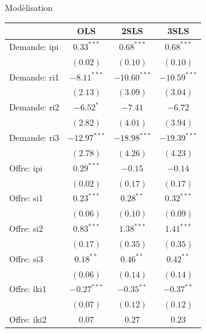 \documentclass[11pt,ignorenonframetext,]{beamer}
\begin{document}
\begin{frame}{Modèlisation}
\protect\hypertarget{modelisation-2}{}

\tiny

\begin{table}[!htbp]
\begin{center}
\begin{tabular}{l c c c }
\hline
 & OLS & 2SLS & 3SLS \\
\hline
Demande: ipi        & $0.33^{***}$   & $0.68^{***}$   & $0.68^{***}$   \\
                    & $(0.02)$       & $(0.10)$       & $(0.10)$       \\
Demande: ri1        & $-8.11^{***}$  & $-10.60^{***}$ & $-10.59^{***}$ \\
                    & $(2.13)$       & $(3.09)$       & $(3.04)$       \\
Demande: ri2        & $-6.52^{*}$    & $-7.41$        & $-6.72$        \\
                    & $(2.82)$       & $(4.01)$       & $(3.94)$       \\
Demande: ri3        & $-12.97^{***}$ & $-18.98^{***}$ & $-19.39^{***}$ \\
                    & $(2.78)$       & $(4.26)$       & $(4.23)$       \\
Offre: ipi          & $0.29^{***}$   & $-0.15$        & $-0.14$        \\
                    & $(0.02)$       & $(0.17)$       & $(0.17)$       \\
Offre: si1          & $0.23^{***}$   & $0.28^{**}$    & $0.32^{***}$   \\
                    & $(0.06)$       & $(0.10)$       & $(0.09)$       \\
Offre: si2          & $0.83^{***}$   & $1.38^{***}$   & $1.41^{***}$   \\
                    & $(0.17)$       & $(0.35)$       & $(0.35)$       \\
Offre: si3          & $0.18^{**}$    & $0.46^{**}$    & $0.42^{**}$    \\
                    & $(0.06)$       & $(0.14)$       & $(0.14)$       \\
Offre: iki1         & $-0.27^{***}$  & $-0.35^{**}$   & $-0.37^{**}$   \\
                    & $(0.07)$       & $(0.12)$       & $(0.12)$       \\
Offre: iki2         & $0.07$         & $0.27$         & $0.23$         \\

\end{tabular}
\end{center}
\end{table}
\end{frame}
\end{document}
